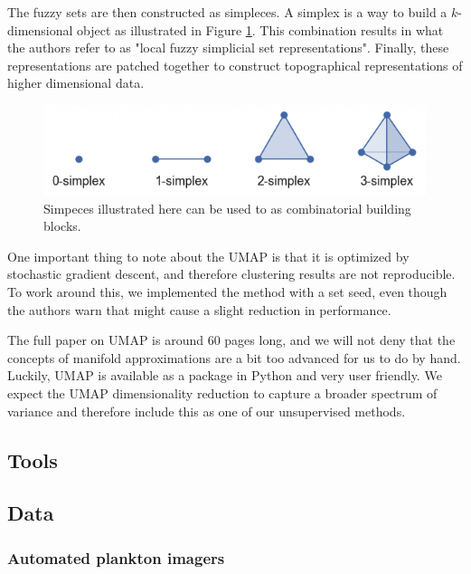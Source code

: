 The fuzzy sets are then constructed as simpleces. A simplex is a way to build a $k$-dimensional object as illustrated in Figure \ref{fig:simpleces}. This combination results in what the authors refer to as "local fuzzy simplicial set representations". Finally, these representations are patched together to construct topographical representations of higher dimensional data. 

\begin{figure}[H]
    \centering
    \includegraphics[width=1\linewidth]{examples/tests_eb/figs/Skjermbilde 2024-12-05 kl. 16.56.40.png}
    \caption{Simpeces illustrated here can be used to as combinatorial building blocks.}
    \label{fig:simpleces}
\end{figure}

One important thing to note about the UMAP is that it is optimized by stochastic gradient descent, and therefore clustering results are not reproducible. To work around this, we implemented the method with a set seed, even though the authors warn that might cause a slight reduction in performance. 

The full paper on UMAP is around 60 pages long, and we will not deny that the concepts of manifold approximations are a bit too advanced for us to do by hand. Luckily, UMAP is available as a package in Python and very user friendly. We expect the UMAP dimensionality reduction to capture a broader spectrum of variance and therefore include this as one of our unsupervised methods.

\subsection{Tools} \label{subsec:tools}
\subsection{Data} \label{subsec:data}

\subsubsection{Automated plankton imagers}

